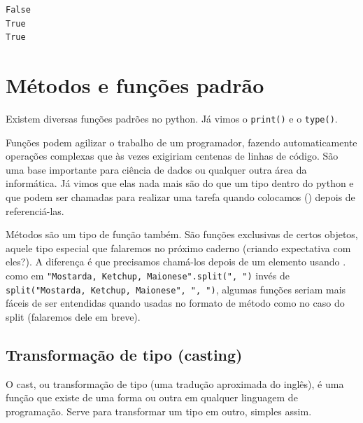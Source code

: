 \documentclass[
  letterpaper,
  DIV=11,
  numbers=noendperiod]{scrreprt}
\begin{document}
\begin{tcolorbox}[enhanced jigsaw, breakable, leftrule=.75mm, left=2mm, opacityback=0, bottomrule=.15mm, toprule=.15mm, rightrule=.15mm, arc=.35mm, colback=white]

\begin{verbatim}
False
True
True
\end{verbatim}

\end{tcolorbox}


\hypertarget{muxe9todos-e-funuxe7uxf5es-padruxe3o}{%
\chapter{Métodos e funções
padrão}\label{muxe9todos-e-funuxe7uxf5es-padruxe3o}}

Existem diversas funções padrões no python. Já vimos o \texttt{print()}
e o \texttt{type()}.

Funções podem agilizar o trabalho de um programador, fazendo
automaticamente operações complexas que às vezes exigiriam centenas de
linhas de código. São uma base importante para ciência de dados ou
qualquer outra área da informática. Já vimos que elas nada mais são do
que um tipo dentro do python e que podem ser chamadas para realizar uma
tarefa quando colocamos () depois de referenciá-las.

Métodos são um tipo de função também. São funções exclusivas de certos
objetos, aquele tipo especial que falaremos no próximo caderno (criando
expectativa com eles?). A diferença é que precisamos chamá-los depois de
um elemento usando . como em
\texttt{"Mostarda,\ Ketchup,\ Maionese".split(",\ ")} invés de
\texttt{split("Mostarda,\ Ketchup,\ Maionese",\ ",\ ")}, algumas funções
seriam mais fáceis de ser entendidas quando usadas no formato de método
como no caso do split (falaremos dele em breve).

\hypertarget{transformauxe7uxe3o-de-tipo-casting}{%
\section{Transformação de tipo
(casting)}\label{transformauxe7uxe3o-de-tipo-casting}}

O cast, ou transformação de tipo (uma tradução aproximada do inglês), é
uma função que existe de uma forma ou outra em qualquer linguagem de
programação. Serve para transformar um tipo em outro, simples assim.
\end{document}
